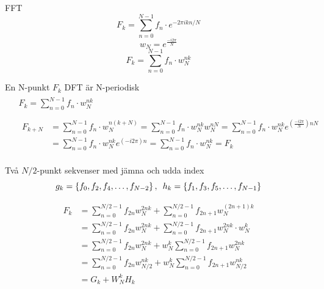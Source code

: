 \documentclass[presentation]{beamer}
\begin{document}
\begin{frame}[label={sec:org5c34459}]{FFT}
\[ F_{k} = \sum_{n=0}^{N-1} f_{n} \cdot e^{-2 \pi i kn/N}\]
\pause
\[ w_{N} = e^{\frac{-i2 \pi}{N}} \]
\pause
\[ F_{k} = \sum_{n=0}^{N-1} f_{n} \cdot w_{N}^{nk} \]
\end{frame}

\begin{frame}[label={sec:orgd8abace}]{En N-punkt \(F_{k}\) DFT är N-periodisk}
\begin{align*}
&\begin{aligned}
  F_{k} = \sum_{n=0}^{N-1}f_{n} \cdot w_{N}^{nk}
\end{aligned} \\
&\begin{aligned}
  \begin{aligned}
  F_{k+N} &= \sum_{n=0}^{N-1}f_{n} \cdot w_{N}^{n(k+N)} = \sum_{n=0}^{N-1}f_{n} \cdot w_{N}^{nk}w_{N}^{nN} = \sum_{n=0}^{N-1}f_{n} \cdot w_{N}^{nk}e^{(\frac{-i2
          \pi}{N}) nN} \\
        &= \sum_{n=0}^{N-1}f_{n} \cdot w_{N}^{nk}e^{(-i2 \pi)n} =
    \sum_{n=0}^{N-1}f_{n} \cdot w_{N}^{nk} = F_{k}
    \end{aligned}
\end{aligned}
\end{align*}
\end{frame}

\begin{frame}[label={sec:orgf3a2de1}]{Två \(N/2\)-punkt sekvenser med jämna och udda index}
\[
  g_{k} = \left\{f_{0}, f_{2}, f_{4}, \dots, f_{N-2}\right\}, \hspace{0.5em}
  h_{k} = \left\{f_{1}, f_{3}, f_{5}, \dots, f_{N-1}\right\} 
\]

\begin{align*}
F_{k} &= \sum_{n=0}^{N/2 - 1}f_{2n}w_{N}^{2nk} + \sum_{n=0}^{N/2 -
  1}f_{2n + 1}w_{N}^{(2n+1)k} \\
  &= \sum_{n=0}^{N/2 - 1}f_{2n}w_{N}^{2nk} + \sum_{n=0}^{N/2 -
    1}f_{2n+1} w_{N}^{2nk} \cdot w_{N}^{k} \\
    &= \sum_{n=0}^{N/2 - 1}f_{2n}w_{N}^{2nk} + w_{N}^{k} \sum_{n=0}^{N/2 -
      1}f_{2n+1} w_{N}^{2nk} \\
      &= \sum_{n=0}^{N/2 - 1}f_{2n}w_{N/2}^{nk} + w_{N}^{k} \sum_{n=0}^{N/2 -
        1}f_{2n+1} w_{N/2}^{nk} \\
  & = G_{k} + W_{N}^{k}H_{k}
\end{align*}
\end{frame}
\end{document}
